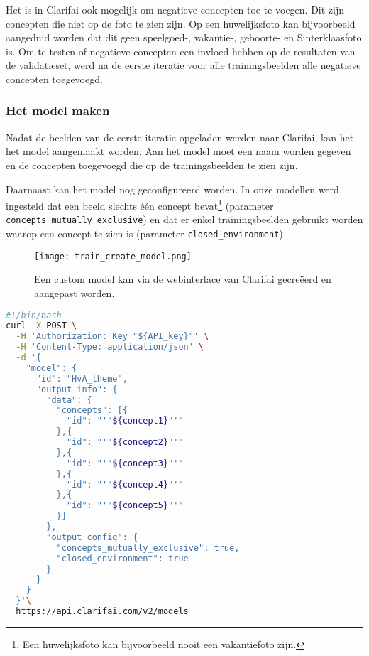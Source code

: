 Het is in Clarifai ook mogelijk om negatieve concepten toe te voegen. Dit zijn concepten die niet op de foto te zien zijn. Op een huwelijksfoto kan bijvoorbeeld aangeduid worden dat dit geen speelgoed-, vakantie-, geboorte- en Sinterklaasfoto is. Om te testen of negatieve concepten een invloed hebben op de resultaten van de validatieset, werd na de eerste iteratie voor alle trainingsbeelden alle negatieve concepten toegevoegd.


\subsubsection{Het model maken}
\label{subsubsec:model-maken}


Nadat de beelden van de eerste iteratie opgeladen werden naar Clarifai, kan het  het model aangemaakt worden. Aan het model moet een naam worden gegeven en de concepten toegevoegd die op de trainingsbeelden te zien zijn. 

Daarnaast kan het model nog geconfigureerd worden. In onze modellen werd ingesteld dat een beeld slechts één concept bevat\footnote{Een huwelijksfoto kan bijvoorbeeld nooit een vakantiefoto zijn.} (parameter \texttt{concepts\_mutually\_exclusive}) en dat er enkel trainingsbeelden gebruikt worden waarop een concept te zien is (parameter \texttt{closed\_environment})

\begin{figure}[h]
	\centering
	\texttt{[image: train\_create\_model.png]}\hfill
	\caption[Een model maken via de webinterface]{Een custom model kan via de webinterface van Clarifai gecreëerd en aangepast worden.}
	\label{fig:model-maken}
\end{figure}

\begin{lstlisting}[language=bash,caption=bash commando om een custom model met vijf concepten te creëren]
#!/bin/bash
curl -X POST \
  -H 'Authorization: Key "${API_key}"' \
  -H 'Content-Type: application/json' \
  -d '{
    "model": {
      "id": "HvA_theme",
      "output_info": {
        "data": {
          "concepts": [{
            "id": "'"${concept1}"'"
          },{
            "id": "'"${concept2}"'"
          },{
            "id": "'"${concept3}"'"
          },{
            "id": "'"${concept4}"'"
          },{
            "id": "'"${concept5}"'"
          }]
        },
        "output_config": {
          "concepts_mutually_exclusive": true,
          "closed_environment": true
        }
      }
    }
  }'\
  https://api.clarifai.com/v2/models
\end{lstlisting}

